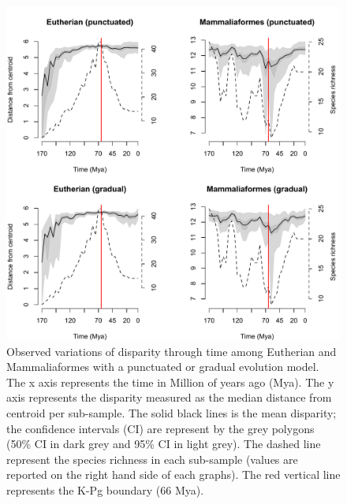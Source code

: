 \documentclass[12pt,letterpaper]{article}
\begin{document}
\begin{figure}[!htbp]
\centering
    \includegraphics[keepaspectratio=true]{Figures/Main_results.pdf}
\caption{Observed variations of disparity through time among Eutherian and Mammaliaformes with a punctuated or gradual evolution model. The x axis represents the time in Million of years ago (Mya). The y axis represents the disparity measured as the median distance from centroid per sub-sample. The solid black lines is the mean disparity; the confidence intervals (CI) are represent by the grey polygons (50\% CI in dark grey and 95\% CI in light grey). The dashed line represent the species richness in each sub-sample (values are reported on the right hand side of each graphs). The red vertical line represents the K-Pg boundary (66 Mya).}
\label{fig:Fig_Raw_results}
\end{figure}
\end{document}
